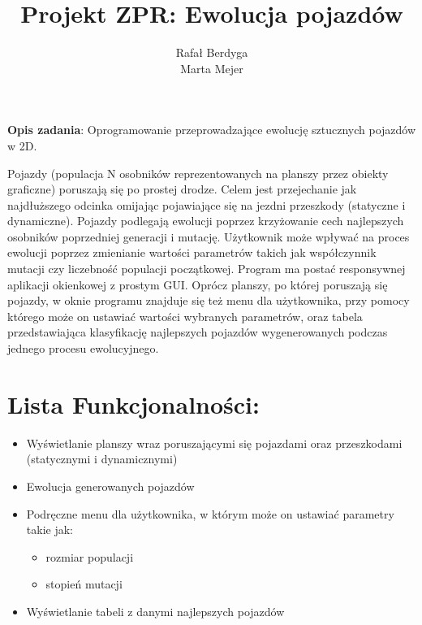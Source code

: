 \documentclass[10pt]{article}
\title {Projekt ZPR: Ewolucja pojazdów}
\author{Rafał Berdyga \\
Marta Mejer \\
}
\date{}
\newcommand{\itemlist}[1]{\begin{itemize}#1\end{itemize}}
\begin{document}
\maketitle
{\bf Opis zadania}:  Oprogramowanie przeprowadzające ewolucję sztucznych pojazdów w 2D. \\ \par
Pojazdy (populacja N osobników reprezentowanych na planszy przez obiekty graficzne) poruszają się po
prostej drodze. Celem jest przejechanie jak najdłuższego odcinka omijając pojawiające się na jezdni
przeszkody (statyczne i dynamiczne). Pojazdy podlegają ewolucji poprzez krzyżowanie cech najlepszych
osobników poprzedniej generacji i mutację. Użytkownik może wpływać na proces ewolucji poprzez zmienianie wartości parametrów takich jak współczynnik mutacji czy liczebność populacji początkowej.
Program ma postać responsywnej aplikacji okienkowej z prostym GUI. Oprócz planszy, po której
poruszają się pojazdy, w oknie programu znajduje się też menu dla użytkownika, przy pomocy którego
może on ustawiać wartości wybranych parametrów, oraz tabela przedstawiająca klasyfikację
najlepszych pojazdów wygenerowanych podczas jednego procesu ewolucyjnego.
\section*{Lista Funkcjonalności:}
\itemlist{
\item Wyświetlanie planszy wraz poruszającymi się pojazdami oraz przeszkodami (statycznymi i dynamicznymi)
\item Ewolucja generowanych pojazdów
\item Podręczne menu dla użytkownika, w którym może on ustawiać parametry takie jak:
\itemlist{
\item rozmiar populacji
\item stopień mutacji
}
\item Wyświetlanie tabeli z danymi najlepszych pojazdów
}
\clearpage
\end{document}
